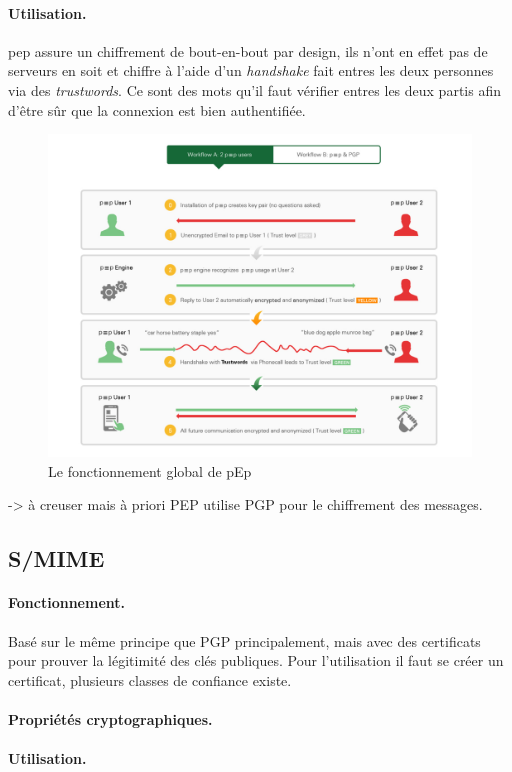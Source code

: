 \paragraph*{Utilisation.}
pep assure un chiffrement de bout-en-bout par design, ils n'ont en effet pas de serveurs en soit et chiffre à l'aide d'un \textit{handshake} fait entres les deux personnes via des \textit{trustwords}. Ce sont des mots qu'il faut vérifier entres les deux partis afin d'être sûr que la connexion est bien authentifiée.
\begin{figure}[h!]
    \includegraphics[width=15cm]{images/conceptualpEp.png}
    \centering
    \caption{Le fonctionnement global de pEp}
    \label{fig:PEP_global}
\end{figure}
-> à creuser mais à priori PEP utilise PGP pour le chiffrement des messages.
\subsection{S/MIME}
\label{protocols:SMIME}
\paragraph*{Fonctionnement.}
Basé sur le même principe que PGP principalement, mais avec des certificats pour prouver la légitimité des clés publiques. Pour l'utilisation il faut se créer un certificat, plusieurs classes de confiance existe. 
\paragraph*{Propriétés cryptographiques.}
\paragraph*{Utilisation.}
